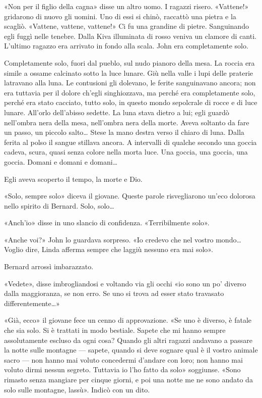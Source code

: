 \documentclass[
a5paper, %
10pt, %
twoside, 
onecolumn, %
openany, %
]{memoir}
\begin{document}
«Non per il figlio della cagna» disse un altro uomo. I ragazzi risero. «Vattene!» gridarono di nuovo gli uomini. Uno di essi si chinò, raccattò una pietra e la scagliò. «Vattene, vattene, vattene!» Ci fu una grandine di pietre. Sanguinando egli fuggì nelle tenebre. Dalla Kiva illuminata di rosso veniva un clamore di canti. L’ultimo ragazzo era arrivato in fondo alla scala. John era completamente solo.

Completamente solo, fuori dal pueblo, sul nudo pianoro della mesa. La roccia era simile a ossame calcinato sotto la luce lunare. Giù nella valle i lupi delle praterie latravano alla luna. Le contusioni gli dolevano, le ferite sanguinavano ancora; non era tuttavia per il dolore ch’egli singhiozzava, ma perché era completamente solo, perché era stato cacciato, tutto solo, in questo mondo sepolcrale di rocce e di luce lunare. All’orlo dell’abisso sedette. La luna stava dietro a lui; egli guardò nell’ombra nera della mesa, nell’ombra nera della morte. Aveva soltanto da fare un passo, un piccolo salto… Stese la mano destra verso il chiaro di luna. Dalla ferita al polso il sangue stillava ancora. A intervalli di qualche secondo una goccia cadeva, scura, quasi senza colore nella morta luce. Una goccia, una goccia, una goccia. Domani e domani e domani…

Egli aveva scoperto il tempo, la morte e Dio.

«Solo, sempre solo» diceva il giovane. Queste parole risvegliarono un’eco dolorosa nello spirito di Bernard. Solo, solo…

«Anch’io» disse in uno slancio di confidenza. «Terribilmente solo».

«Anche voi?» John lo guardava sorpreso. «Io credevo che nel vostro mondo… Voglio dire, Linda afferma sempre che laggiù nessuno era mai solo».

Bernard arrossì imbarazzato.

«Vedete», disse imbrogliandosi e voltando via gli occhi «io sono un po’ diverso dalla maggioranza, se non erro. Se uno si trova ad esser stato travasato differentemente…»

«Già, ecco» il giovane fece un cenno di approvazione. «Se uno è diverso, è fatale che sia solo. Si è trattati in modo bestiale. Sapete che mi hanno sempre assolutamente escluso da ogni cosa? Quando gli altri ragazzi andavano a passare la notte sulle montagne — sapete, quando si deve sognare qual è il vostro animale sacro — non hanno mai voluto concedermi d’andare con loro; non hanno mai voluto dirmi nessun segreto. Tuttavia io l’ho fatto da solo» soggiunse. «Sono rimasto senza mangiare per cinque giorni, e poi una notte me ne sono andato da solo sulle montagne, lassù». Indicò con un dito.
\end{document}
